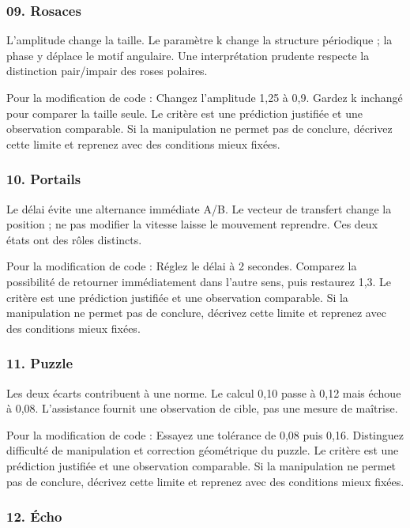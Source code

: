 \documentclass[
  canadien,
  11pt,
  letterpaper,
]{article}
\begin{document}
\subsubsection{09. Rosaces}\label{rosaces}

L'amplitude change la taille. Le paramètre k change la structure
périodique ; la phase y déplace le motif angulaire. Une interprétation
prudente respecte la distinction pair/impair des roses polaires.

Pour la modification de code : Changez l'amplitude 1,25 à 0,9. Gardez k
inchangé pour comparer la taille seule. Le critère est une prédiction
justifiée et une observation comparable. Si la manipulation ne permet
pas de conclure, décrivez cette limite et reprenez avec des conditions
mieux fixées.

\subsubsection{10. Portails}\label{portails}

Le délai évite une alternance immédiate A/B. Le vecteur de transfert
change la position ; ne pas modifier la vitesse laisse le mouvement
reprendre. Ces deux états ont des rôles distincts.

Pour la modification de code : Réglez le délai à 2 secondes. Comparez la
possibilité de retourner immédiatement dans l'autre sens, puis restaurez
1,3. Le critère est une prédiction justifiée et une observation
comparable. Si la manipulation ne permet pas de conclure, décrivez cette
limite et reprenez avec des conditions mieux fixées.

\subsubsection{11. Puzzle}\label{puzzle}

Les deux écarts contribuent à une norme. Le calcul 0,10 passe à 0,12
mais échoue à 0,08. L'assistance fournit une observation de cible, pas
une mesure de maîtrise.

Pour la modification de code : Essayez une tolérance de 0,08 puis 0,16.
Distinguez difficulté de manipulation et correction géométrique du
puzzle. Le critère est une prédiction justifiée et une observation
comparable. Si la manipulation ne permet pas de conclure, décrivez cette
limite et reprenez avec des conditions mieux fixées.

\subsubsection{12. Écho}\label{uxe9cho}
\end{document}
